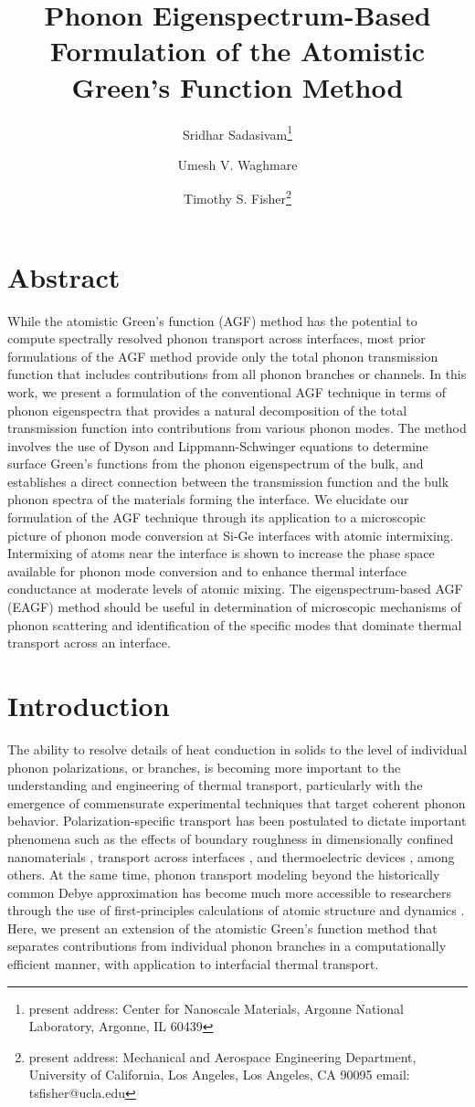 \documentclass[11pt]{article}
\title{Phonon Eigenspectrum-Based Formulation of the Atomistic Green's Function Method}
\author[1]{Sridhar Sadasivam\footnote{present address: Center for Nanoscale Materials, Argonne National Laboratory, Argonne, IL 60439}}
\author[2]{Umesh V. Waghmare}
\author[1]{Timothy S. Fisher\footnote{present address: Mechanical and Aerospace Engineering Department, University of California, Los Angeles, Los Angeles, CA 90095 email: tsfisher@ucla.edu}}
\affil[1]{School of Mechanical Engineering and Birck Nanotechnology Center, Purdue University, West Lafayette, IN 47907}
\affil[2]{Theoretical Sciences Unit, Jawaharlal Nehru Centre for Advanced Scientific Research, Jakkur, Bangalore 560064}
\date{\vspace{-10ex}}
\begin{document}
\maketitle
\section*{Abstract}
While the atomistic Green's function (AGF) method has the potential to compute spectrally resolved phonon transport across interfaces, most prior formulations of the AGF method provide only the total phonon transmission function that includes contributions from all phonon branches or channels. In this work, we present a formulation of the conventional AGF technique in terms of phonon eigenspectra that provides a natural decomposition of the total transmission function into contributions from various phonon modes. The method involves the use of Dyson and Lippmann-Schwinger equations to determine surface Green's functions from the phonon eigenspectrum of the bulk, and establishes a direct connection between the transmission function and the bulk phonon spectra of the materials forming the interface. We elucidate our formulation of the AGF technique through its application to a microscopic picture of phonon mode conversion at Si-Ge interfaces with atomic intermixing. Intermixing of atoms near the interface is shown to increase the phase space available for phonon mode conversion and to enhance thermal interface conductance at moderate levels of atomic mixing. The eigenspectrum-based AGF (EAGF) method should be useful in determination of microscopic mechanisms of phonon scattering and identification of the specific modes that dominate thermal transport across an interface.
 \section{Introduction}
The ability to resolve details of heat conduction in solids to the level of individual phonon polarizations, or branches, is becoming more important to the understanding and engineering of thermal transport, particularly with the emergence of commensurate experimental techniques that target coherent phonon behavior. Polarization-specific transport has been postulated to dictate important phenomena such as the effects of boundary roughness in dimensionally confined nanomaterials \cite{feser2012thermal}, transport across interfaces \cite{singh2011effect}, and thermoelectric devices \cite{nolas1999skutterudites}, among others. At the same time, phonon transport modeling beyond the historically common Debye approximation has become much more accessible to researchers through the use of first-principles calculations of atomic structure and dynamics \cite{baroni2001phonons}. Here, we present an extension of the atomistic Green's function method that separates contributions from individual phonon branches in a computationally efficient manner, with application to interfacial thermal transport. 
\end{document}

